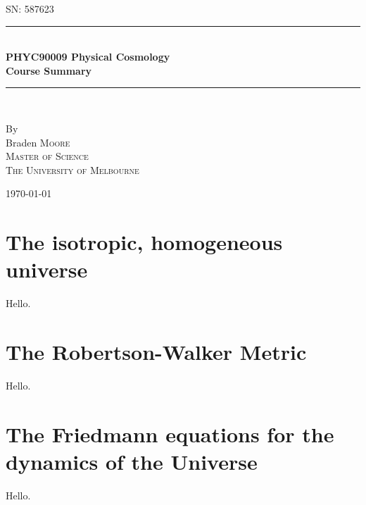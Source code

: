 \documentclass[a4paper]{article} %
\begin{document}
\pagestyle{empty}

\newcommand{\HRule}{\rule{\linewidth}{0.5mm}}

\begin{titlepage}

    \begin{center}
        \textsc{\large SN: 587623}\\[6cm]

        \HRule \\[0.5cm]
		\Huge \textbf{PHYC90009 Physical Cosmology}\\[0.5cm]
        \huge \textbf{Course Summary}\\[0.5cm] 
        \HRule \\[1.5cm]
        \begin{minipage}{0.4\textwidth}
        \begin{center}

        \large By \\[0.75cm]
        \huge Braden \scshape Moore \\[0.5cm]
        \normalsize \normalfont Master of Science \\
        The University of Melbourne \\

        \end{center}
        \end{minipage}

        \vfill

        \large \today
    \end{center}

\newpage
\end{titlepage}
\pagestyle{fancy}
\tableofcontents
\newpage

\lfoot{\textsc{\today}}
\setcounter{page}{1}
\section{The isotropic, homogeneous universe}
Hello.
 
\section{The Robertson-Walker Metric}
Hello.
 
\section{The Friedmann equations for the dynamics of the Universe}
Hello.
 
\end{document}
